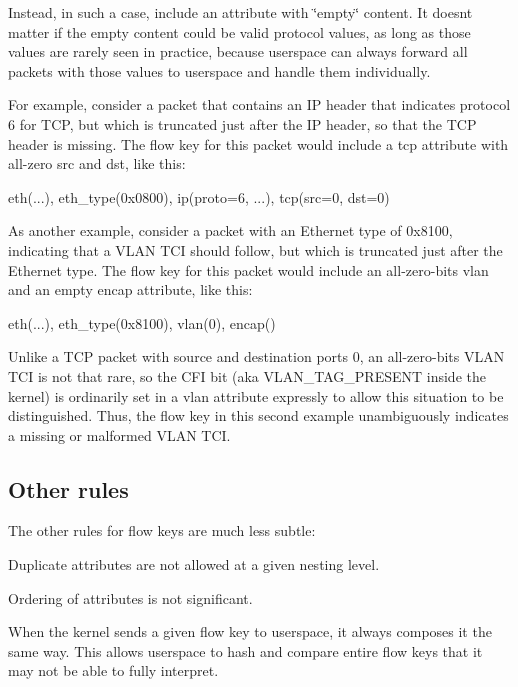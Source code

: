 Instead, in such a case, include an attribute with \char`\"{}empty\char`\"{} content. It doesn\textquotesingle{}t matter if the empty content could be valid protocol values, as long as those values are rarely seen in practice, because userspace can always forward all packets with those values to userspace and handle them individually.

For example, consider a packet that contains an I\+P header that indicates protocol 6 for T\+C\+P, but which is truncated just after the I\+P header, so that the T\+C\+P header is missing. The flow key for this packet would include a tcp attribute with all-\/zero src and dst, like this\+: \begin{DoxyVerb}eth(...), eth_type(0x0800), ip(proto=6, ...), tcp(src=0, dst=0)
\end{DoxyVerb}


As another example, consider a packet with an Ethernet type of 0x8100, indicating that a V\+L\+A\+N T\+C\+I should follow, but which is truncated just after the Ethernet type. The flow key for this packet would include an all-\/zero-\/bits vlan and an empty encap attribute, like this\+: \begin{DoxyVerb}eth(...), eth_type(0x8100), vlan(0), encap()
\end{DoxyVerb}


Unlike a T\+C\+P packet with source and destination ports 0, an all-\/zero-\/bits V\+L\+A\+N T\+C\+I is not that rare, so the C\+F\+I bit (aka V\+L\+A\+N\+\_\+\+T\+A\+G\+\_\+\+P\+R\+E\+S\+E\+N\+T inside the kernel) is ordinarily set in a vlan attribute expressly to allow this situation to be distinguished. Thus, the flow key in this second example unambiguously indicates a missing or malformed V\+L\+A\+N T\+C\+I.

\subsection*{Other rules }

The other rules for flow keys are much less subtle\+:


\begin{DoxyItemize}
\item Duplicate attributes are not allowed at a given nesting level.
\item Ordering of attributes is not significant.
\item When the kernel sends a given flow key to userspace, it always composes it the same way. This allows userspace to hash and compare entire flow keys that it may not be able to fully interpret.
\end{DoxyItemize}

